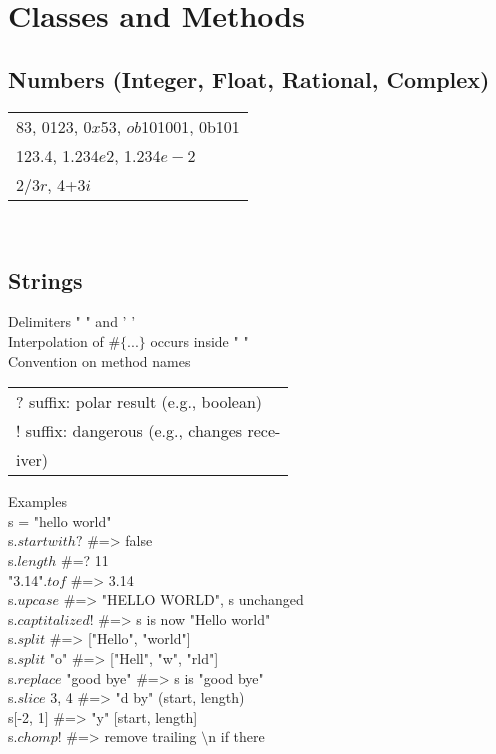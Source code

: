 \section{Classes and Methods}
\subsection*{Numbers (Integer, Float, Rational, Complex)}
\begin{tabular}{ l }
\rowcolor{Gray}
83, $0$123, $0x$53, $ob$101001, 0b101\textunderscore 001\\
123.4, 1.234$e2$, 1.234$e-2$ \\
\rowcolor{Gray}
2/3$r$, 4+3$i$ \\
\end{tabular}
\\

\subsection*{Strings}
Delimiters " " and ' '\phantom{spa} \\
Interpolation of $\#\{...\}$ occurs inside " " \\
Convention on method names\\
\begin{tabular}{ l }
\rowcolor{Gray}
? suffix: polar result (e.g., boolean)\\
! suffix: dangerous (e.g., changes rece-\\
iver)\\
\end{tabular}
Examples\\
s = "hello world" \\
s.$start$\textunderscore $with?$ \#=> false\\
s.$length$ \#=? 11\\
"3.14".$to$\textunderscore$f$ \#=> 3.14\\
s.$upcase$ \#=> "HELLO WORLD", s unchanged\\
s.$captitalized!$ \#=> s is now "Hello world"\\
s.$split$ \#=> ["Hello", "world"]\\
s.$split$ "o" \#=> ["Hell", "w", "rld"]\\
s.$replace$ "good bye" \#=> s is "good bye"\\
s.$slice$ 3, 4 \#=> "d by" (start, length)\\
s$[$-2, 1$]$ \#=> "y" [start, length]\\
s.$chomp!$ \#=> remove trailing $\setminus$n if there\\

